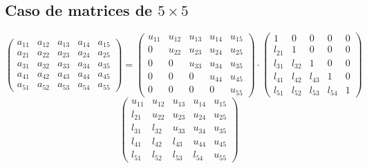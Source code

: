 \documentclass[10pt,a4paper,dvipdfmx]{article}
\begin{document}
\subsection{Caso de matrices de $5\times 5$ }
$$ \left( 
\begin{array}{ccccc}
a_{{1}{1}} & a_{{1}{2}} & a_{{1}{3}} & a_{{1}{4}} & a_{{1}{5}} \\
a_{{2}{1}} & a_{{2}{2}} & a_{{2}{3}} & a_{{2}{4}} & a_{{2}{5}} \\
a_{{3}{1}} & a_{{3}{2}} & a_{{3}{3}} & a_{{3}{4}} & a_{{3}{5}} \\
a_{{4}{1}} & a_{{4}{2}} & a_{{4}{3}} & a_{{4}{4}} & a_{{4}{5}} \\
a_{{5}{1}} & a_{{5}{2}} & a_{{5}{3}} & a_{{5}{4}} & a_{{5}{5}} 
 \end{array}
\right)
 = \left( 
\begin{array}{ccccc}
u_{{1}{1}} & u_{{1}{2}} & u_{{1}{3}} & u_{{1}{4}} & u_{{1}{5}} \\
0 & u_{{2}{2}} & u_{{2}{3}} & u_{{2}{4}} & u_{{2}{5}} \\
0 & 0 & u_{{3}{3}} & u_{{3}{4}} & u_{{3}{5}} \\
0 & 0 & 0 & u_{{4}{4}} & u_{{4}{5}} \\
0 & 0 & 0 & 0 & u_{{5}{5}} 
 \end{array}
\right)
 \cdot \left( 
\begin{array}{ccccc}
1 & 0 & 0 & 0 & 0 \\
l_{{2}{1}} & 1 & 0 & 0 & 0 \\
l_{{3}{1}} & l_{{3}{2}} & 1 & 0 & 0 \\
l_{{4}{1}} & l_{{4}{2}} & l_{{4}{3}} & 1 & 0 \\
l_{{5}{1}} & l_{{5}{2}} & l_{{5}{3}} & l_{{5}{4}} & 1 
 \end{array}
\right)
 $$
$$ \left( 
\begin{array}{ccccc}
u_{{1}{1}} & u_{{1}{2}} & u_{{1}{3}} & u_{{1}{4}} & u_{{1}{5}} \\
l_{{2}{1}} & u_{{2}{2}} & u_{{2}{3}} & u_{{2}{4}} & u_{{2}{5}} \\
l_{{3}{1}} & l_{{3}{2}} & u_{{3}{3}} & u_{{3}{4}} & u_{{3}{5}} \\
l_{{4}{1}} & l_{{4}{2}} & l_{{4}{3}} & u_{{4}{4}} & u_{{4}{5}} \\
l_{{5}{1}} & l_{{5}{2}} & l_{{5}{3}} & l_{{5}{4}} & u_{{5}{5}} 
 \end{array}
\right)
 $$
\end{document}
